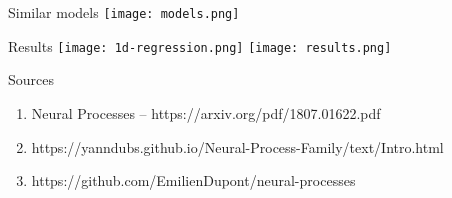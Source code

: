 \documentclass{beamer}%
\theoremstyle{definition}
\begin{document}
\begin{frame}{Similar models}
    \texttt{[image: models.png]}
\end{frame}

\begin{frame}{Results}
    \texttt{[image: 1d-regression.png]}
    \texttt{[image: results.png]}
\end{frame}

\begin{frame}{Sources}
\begin{enumerate}
    \item Neural Processes -- https://arxiv.org/pdf/1807.01622.pdf
    \item https://yanndubs.github.io/Neural-Process-Family/text/Intro.html
    \item https://github.com/EmilienDupont/neural-processes
\end{enumerate}
\begin{enumerate}
\end{enumerate}
\end{frame}
\end{document}

